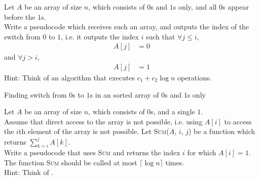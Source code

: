 \documentclass[titlepage, fleqn, a4paper, 12pt, twoside]{article}
\theoremstyle{definition}
\theoremstyle{theorem}
\begin{document}
\begin{question}
	Let $A$ be an array of size $n$, which consists of $0$s and $1$s only, and all $0$s appear before the $1$s.\\
	Write a pseudocode which receives such an array, and outputs the index of the switch from $0$ to $1$, i.e. it outputs the index $i$ such that $\forall j \le i$,
	\begin{align*}
		A[j] & = 0
	\end{align*}
	and $\forall j > i$,
	\begin{align*}
		A[j] & = 1
	\end{align*}
	Hint: Think of an algorithm that executes $c_1 + c_2 \log n$ operations.
\end{question}

\begin{solution}
	\begin{algorithm}[H]
		\begin{algorithmic}[1]
			\Statex
				\EndIf
				\EndIf
					\Else
					\EndIf
				\EndWhile
			\EndFunction
		\end{algorithmic}
		\caption{Finding switch from $0$s to $1$s in an sorted array of $0$s and $1$s only}
	\end{algorithm}
\end{solution}

\begin{question}
	Let $A$ be an array of size $n$, which consists of $0$s, and a single $1$.\\
	Assume that direct access to the array is not possible, i.e. using $A[i]$ to access the $i$th element of the array is not possible.
	Let \textsc{Sum}($A$, $i$, $j$) be a function which returns $\sum\limits_{k = i}^{j} A[k]$.\\
	Write a pseudocode that uses \textsc{Sum} and returns the index $i$ for which $A[i] = 1$.
	The function \textsc{Sum} should be called at most $\lceil \log n \rceil$ times.\\
	Hint: Think of .
\end{question}
\end{document}
